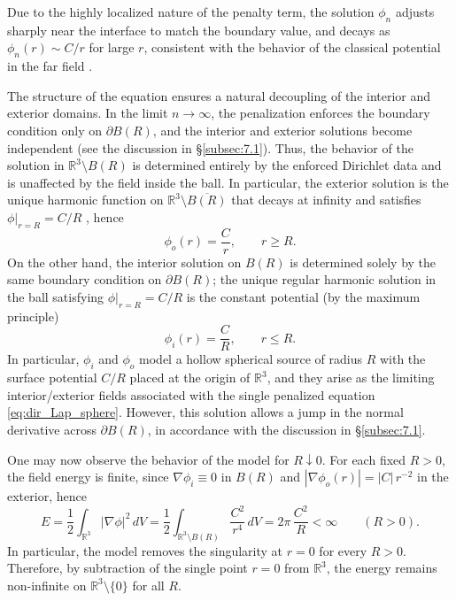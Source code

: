 \documentclass[preprint,12pt]{elsarticle}
\theoremstyle{plain}
\theoremstyle{definition}
\theoremstyle{note}
\newcommand{\R}{\mathbb{R}}
\begin{document}
Due to the highly localized nature of the penalty term, the solution $\phi_n$ adjusts sharply near
the interface to match the boundary value, and decays as $\phi_n(r)\sim C/r$ for large $r$, consistent with the behavior of the classical potential in the far field  \cite{Jackson1998,Kellogg1929}.

The structure of the equation ensures a natural decoupling of the interior and exterior domains. In the limit $n\to\infty$, the penalization enforces the boundary condition only on $\partial B(R)$, and the interior and exterior solutions become independent (see the discussion in \S \ref{subsec:7.1}). Thus, the behavior of the solution in $\mathbb{R}^3\setminus B(R)$ is determined entirely by the enforced Dirichlet data and is unaffected by the field inside the ball. In particular, the exterior solution is the unique harmonic function on $\mathbb{R}^3\setminus \overline{B(R)}$ that decays at infinity and satisfies $\phi|_{r=R}=C/R$ \cite{Evans2010,GilbargTrudinger2001}, hence
\begin{equation}
\phi_o(r)=\frac{C}{r},\qquad r\ge R.
\end{equation}
On the other hand, the interior solution on $B(R)$ is determined solely by the same boundary condition on $\partial B(R)$; the unique regular harmonic solution in the ball satisfying $\phi|_{r=R}=C/R$ is the constant potential (by the maximum principle) \cite{Evans2010,GilbargTrudinger2001}
\begin{equation}
\phi_i(r)=\frac{C}{R},\qquad r\le R.
\end{equation}
In particular, $\phi_i$ and $\phi_o$ model a hollow spherical source of radius $R$ with the surface potential $C/R$ placed at the origin of $\R^3$, and they arise as the limiting interior/exterior fields associated with the single penalized equation \eqref{eq:dir_Lap_sphere}. However, this solution allows a jump in the normal derivative across $\partial B(R)$, in accordance with the discussion in \S \ref{subsec:7.1}.

One may now observe the behavior of the model for $R\downarrow 0$. For each fixed $R>0$, the field energy is finite, since $\nabla\phi_i\equiv 0$ in $B(R)$ and $|\nabla\phi_o(r)|=|C|\,r^{-2}$ in the exterior, hence
\begin{equation}
E =\frac{1}{2}\int_{\mathbb{R}^3}|\nabla \phi|^2\,dV
=\frac{1}{2}\int_{\R^3\setminus B(R)} \frac{C^2}{r^4}\,dV
=2\pi\,\frac{C^2}{R}<\infty\qquad (R>0).
\end{equation}
In particular, the model removes the singularity at $r=0$ for every $R>0$. Therefore, by subtraction of the single point $r=0$ from $\R^3$, the energy remains non-infinite on $\R^3 \setminus \{0\}$ for all $R$. 
\end{document}
